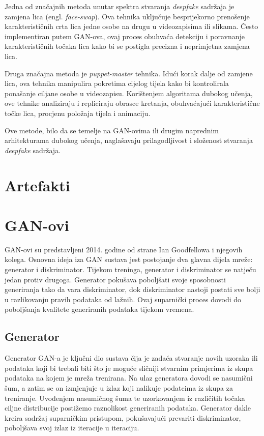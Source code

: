 \documentclass[seminarski, times, utf8]{fer}
\begin{document}
Jedna od značajnih metoda unutar spektra stvaranja \textit{deepfake} sadržaja je zamjena lica (engl. \textit{face-swap}). Ova tehnika uključuje besprijekorno prenošenje karakterističnih crta lica jedne osobe na drugu u videozapisima ili slikama. Često implementiran putem GAN-ova, ovaj proces obuhvaća detekciju i poravnanje karakterističnih točaka lica kako bi se postigla precizna i neprimjetna zamjena lica.

Druga značajna metoda je \textit{puppet-master} tehnika. Idući korak dalje od zamjene lica, ova tehnika manipulira pokretima cijelog tijela kako bi kontrolirala ponašanje ciljane osobe u videozapisu. Korištenjem algoritama dubokog učenja, ove tehnike analiziraju i repliciraju obrasce kretanja, obuhvaćajući karakteristične točke lica, procjenu položaja tijela i animaciju.

Ove metode, bilo da se temelje na GAN-ovima ili drugim naprednim arhitekturama dubokog učenja, naglašavaju prilagodljivost i složenost stvaranja \textit{deepfake} sadržaja. 

\section{Artefakti}
\section{GAN-ovi}
GAN-ovi su predstavljeni 2014. godine od strane Ian Goodfellowa i njegovih kolega.
Osnovna ideja iza GAN sustava jest postojanje dva glavna dijela mreže: generator i diskriminator.
Tijekom treninga, generator i diskriminator se natječu jedan protiv drugoga. Generator pokušava poboljšati svoje sposobnosti generiranja tako da vara diskriminator, dok diskriminator nastoji postati sve bolji u razlikovanju pravih podataka od lažnih. Ovaj suparnički proces dovodi do poboljšanja kvalitete generiranih podataka tijekom vremena.

\subsection{Generator}
Generator GAN-a je ključni dio sustava čija je zadaća stvaranje novih uzoraka ili podataka koji bi trebali biti što je moguće sličniji stvarnim primjerima iz skupa podataka na kojem je mreža trenirana. 
Na ulaz generatora dovodi se nasumični šum, a zatim se on izmjenjuje u izlaz koji nalikuje podatcima iz skupa za treniranje. Uvođenjem nasumičnog šuma te uzorkovanjem iz različitih točaka ciljne distribucije postižemo raznolikost generiranih podataka.
Generator dakle kreira sadržaj suparničkim pristupom, pokušavajući prevariti diskriminator, poboljšava svoj izlaz iz iteracije u iteraciju.
\end{document}
